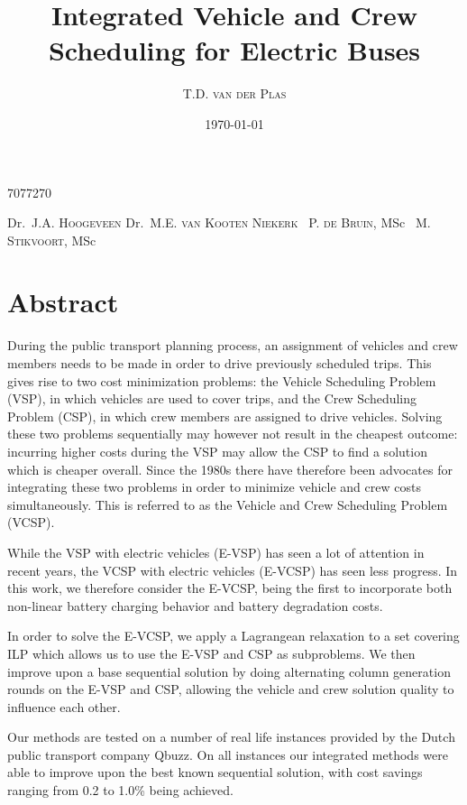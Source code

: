 \documentclass[]{article}
\begin{document}
\title{Integrated Vehicle and Crew Scheduling for Electric Buses}
\author
    {T.D. \textsc{van der Plas}} %
    {7077270}           %
\date{\today}

\supervisors
    {Dr.~J.A. \textsc{Hoogeveen}} %
    {Dr.~M.E. \textsc{van Kooten Niekerk}} %
    {~P. \textsc{de Bruin}, MSc} %
    {~M. \textsc{Stikvoort}, MSc} %



\section*{Abstract}
During the public transport planning process, an assignment of vehicles and crew members needs to be made in order to drive previously scheduled trips. This gives rise to two cost minimization problems: the Vehicle Scheduling Problem (VSP), in which vehicles are used to cover trips, and the Crew Scheduling Problem (CSP), in which crew members are assigned to drive vehicles. Solving these two problems sequentially may however not result in the cheapest outcome: incurring higher costs during the VSP may allow the CSP to find a solution which is cheaper overall. Since the 1980s there have therefore been advocates for integrating these two problems in order to minimize vehicle and crew costs simultaneously. This is referred to as the Vehicle and Crew Scheduling Problem (VCSP). 

While the VSP with electric vehicles (E-VSP) has seen a lot of attention in recent years, the VCSP with electric vehicles (E-VCSP) has seen less progress. In this work, we therefore consider the E-VCSP, being the first to incorporate both non-linear battery charging behavior and battery degradation costs. 

In order to solve the E-VCSP, we apply a Lagrangean relaxation to a set covering ILP which allows us to use the E-VSP and CSP as subproblems. We then improve upon a base sequential solution by doing alternating column generation rounds on the E-VSP and CSP, allowing the vehicle and crew solution quality to influence each other. 

Our methods are tested on a number of real life instances provided by the Dutch public transport company Qbuzz. On all instances our integrated methods were able to improve upon the best known sequential solution, with cost savings ranging from 0.2 to 1.0\% being achieved. 

\newpage
\end{document}

